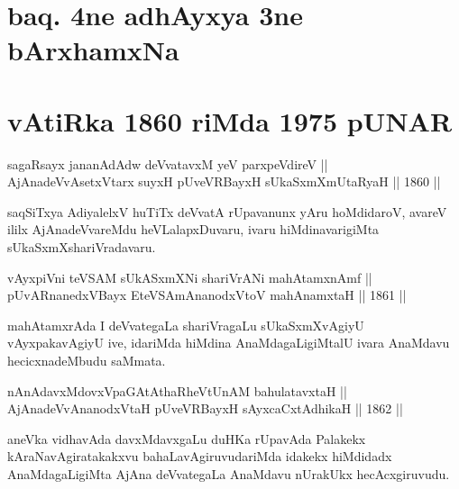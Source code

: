 \section*{baq. 4ne adhAyxya 3ne bArxhamxNa}

\section*{vAtiRka 1860 riMda 1975 pUNAR}


\begin{shl}
sagaRsayx jananAdAdw deVvatavxM yeV parxpeVdireV || \\
AjAnadeVvAsetxV\s tarx suyxH pUveVRBayxH sUkaSxmXmUtaRyaH ||  1860 ||  
\end{shl}

\begin{artha}
saqSiTxya AdiyalelxV huTiTx deVvatA rUpavanunx yAru hoMdidaroV, avareV
ililx AjAnadeVvareMdu heVLalapxDuvaru, ivaru hiMdinavarigiMta
sUkaSxmXshariVradavaru.
\end{artha}


\begin{shl}
vAyxpiVni teVSAM sUkASxmXNi shariVrANi mahAtamxnAmf || \\
pUvARnanedxVBayx EteVSAmAnanodxV\s toV mahAnamxtaH ||  1861 ||  
\end{shl}

\begin{artha}
mahAtamxrAda I deVvategaLa shariVragaLu sUkaSxmXvAgiyU vAyxpakavAgiyU
ive, idariMda hiMdina AnaMdagaLigiMtalU ivara AnaMdavu hecicxnadeMbudu
saMmata.
\end{artha}

\begin{shl}
nAnAdavxMdovxVpaGAtAthaRheVtUnAM bahulatavxtaH || \\
AjAnadeVvAnanodxV\s taH pUveVRBayxH sAyxcaCxtAdhikaH ||  1862 ||  
\end{shl}

\begin{artha}
aneVka vidhavAda davxMdavxgaLu duHKa rUpavAda Palakekx kAraNavAgiratakakxvu bahaLavAgiruvudariMda idakekx hiMdidadx AnaMdagaLigiMta AjAna deVvategaLa AnaMdavu nUrakUkx hecAcxgiruvudu.
\end{artha}


